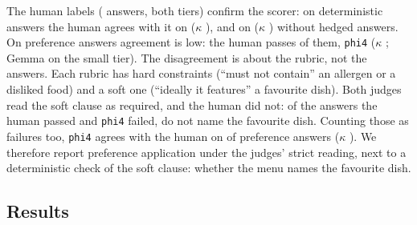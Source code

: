 The human labels ( answers, both tiers) confirm the scorer: on deterministic
answers the human agrees with it on  ($\kappa$
), and on  ($\kappa$
) without hedged answers. On preference answers agreement is
low: the human passes  of them, \texttt{phi4}
 ($\kappa$ ; Gemma
 on the small tier). The disagreement is about the rubric, not
the answers. Each rubric has hard constraints (``must not contain'' an allergen or a disliked
food) and a soft one (``ideally it features'' a favourite dish). Both judges read the soft clause
as required, and the human did not: of the  answers the human
passed and \texttt{phi4} failed,  do not name the favourite
dish. Counting those as failures too, \texttt{phi4} agrees with the human on
 of preference answers ($\kappa$
). We therefore report preference application under the
judges' strict reading, next to a deterministic check of the soft clause: whether the menu names
the favourite dish.

\subsection{Results}

\begin{table}[t]
\centering
\caption{\PFM by condition and tier, averaged over personas and the six cross-engine pairs, with
95\% bootstrap intervals over personas, and mean prompt tokens of the carried memory. Strong
extractor: Gemma~4 31B (small tier), Claude Opus~5.5 (large tier).}
\label{tab:pfm}
\end{table}

\begin{table}[t]
\centering
\caption{\PFM by condition and probe kind, large tier.}
\label{tab:kinds}
\end{table}

\begin{table}[t]
\centering
\caption{\PFM by source$\to$target pair, large tier.}
\label{tab:pairs}
\end{table}

